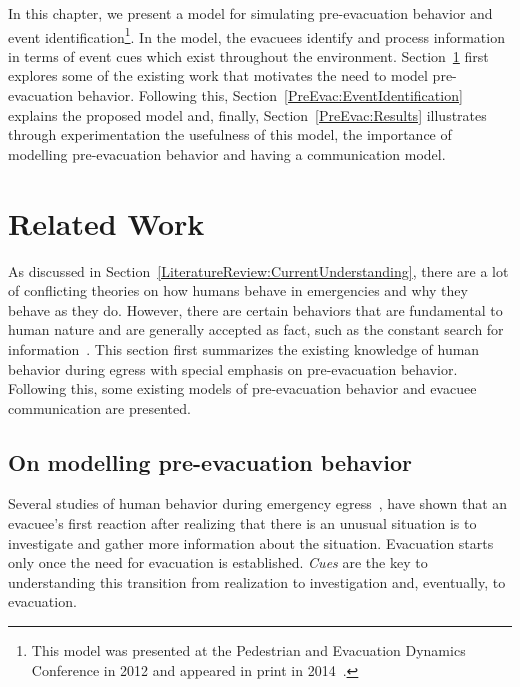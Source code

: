 In this chapter, we present a model for simulating pre-evacuation behavior and event identification\footnote{This model was presented at the Pedestrian and Evacuation Dynamics Conference in 2012 and appeared in print in 2014~\cite{Viswanathan:2012vt}.}. In the model, the evacuees identify and process information in terms of event cues which exist throughout the environment. Section~\ref{PreEvac:LitRev} first explores some of the existing work that motivates the need to model pre-evacuation behavior. Following this, Section~\ref{PreEvac:EventIdentification} explains the proposed model and, finally, Section~\ref{PreEvac:Results} illustrates through experimentation the usefulness of this model, the importance of modelling pre-evacuation behavior and having a communication model.



\section{Related Work}
\label{PreEvac:LitRev}


As discussed in Section~\ref{LiteratureReview:CurrentUnderstanding}, there are a lot of conflicting theories on how humans behave in emergencies and why they behave as they do. However, there are certain behaviors that are fundamental to human nature and are generally accepted as fact, such as the constant search for information~\cite{Proulx:2003tc,Tong:1985wn,Ozel:2001tn,Sime:1983uy}. This section first summarizes the existing knowledge of human behavior during egress with special emphasis on pre-evacuation behavior. Following this, some existing models of pre-evacuation behavior and evacuee communication are presented.

\subsection{On modelling pre-evacuation behavior}
\label{PreEvac:PreEvacuationBehavior}

Several studies of human behavior during emergency egress~\cite{Kuligowski:2005tt,Ozel:2001tn,Proulx:2007ul}, have shown that an evacuee's first reaction after realizing that there is an unusual situation is to investigate and gather more information about the situation. Evacuation starts only once the need for evacuation is established. \emph{Cues} are the key to understanding this transition from realization to investigation and, eventually, to evacuation.

